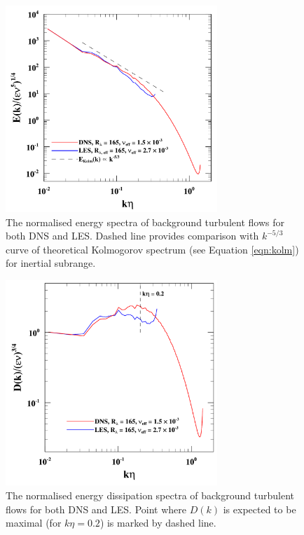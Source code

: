 \documentclass{pracamgren}
\begin{document}
\begin{figure}[h]
\centering
\includegraphics[width=8cm]{img/plots/2-1-2a-spec.pdf}
\caption{
The normalised energy spectra of background turbulent flows for both DNS and LES. Dashed line provides comparison with $k^{-5/3}$ curve of theoretical Kolmogorov spectrum (see Equation \ref{eqn:kolm}) for inertial subrange.
}
\label{fig:spec}
\end{figure}

\begin{figure}[h]
\centering
\includegraphics[width=8cm]{img/plots/2-1-2b-diss.pdf}
\caption{
The normalised energy dissipation spectra of background turbulent flows for both DNS and LES.
Point where $D(k)$ is expected to be maximal (for $k \eta = 0.2$) is marked by dashed line. 
}
\label{fig:diss}
\end{figure}
\end{document}
